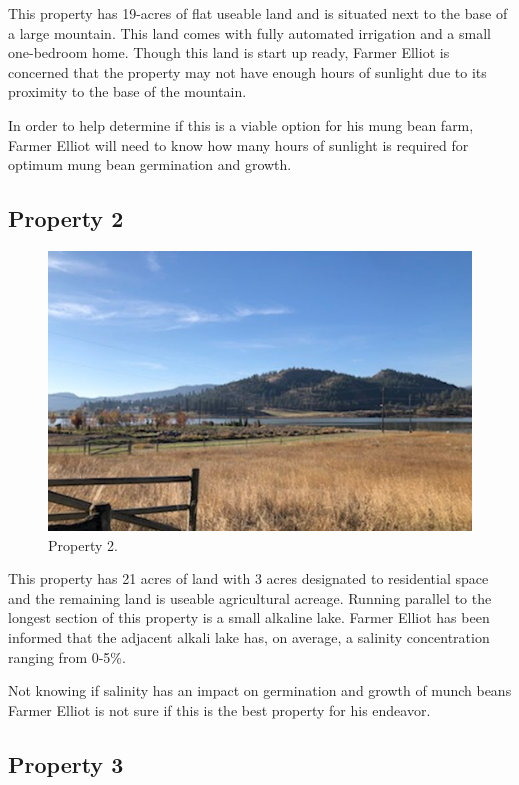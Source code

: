 \documentclass[
]{book}
\begin{document}
This property has 19-acres of flat useable land and is situated next to the base of a large mountain. This land comes with fully automated irrigation and a small one-bedroom home. Though this land is start up ready, Farmer Elliot is concerned that the property may not have enough hours of sunlight due to its proximity to the base of the mountain.

In order to help determine if this is a viable option for his mung bean farm, Farmer Elliot will need to know how many hours of sunlight is required for optimum mung bean germination and growth.

\hypertarget{property-2}{%
\subsection*{Property 2}\label{property-2}}

\begin{figure}
\centering
\includegraphics{images/prop-2.png}
\caption{Property 2.}
\end{figure}

This property has 21 acres of land with 3 acres designated to residential space and the remaining land is useable agricultural acreage. Running parallel to the longest section of this property is a small alkaline lake. Farmer Elliot has been informed that the adjacent alkali lake has, on average, a salinity concentration ranging from 0-5\%.

Not knowing if salinity has an impact on germination and growth of munch beans Farmer Elliot is not sure if this is the best property for his endeavor.

\hypertarget{property-3}{%
\subsection*{Property 3}\label{property-3}}
\end{document}
